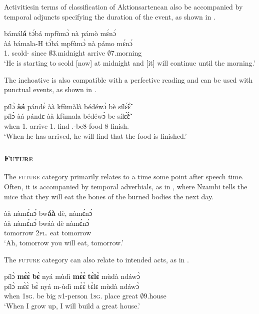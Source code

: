 Activities{\textemdash}in terms of  classification of Aktionsarten{\textemdash}can also be accompanied by temporal adjuncts specifying the duration of the event, as shown in .

\ea\label{inchbound}
   bámál{\bfseries á} tɔ́bá mpfùmɔ̀ nà pámò mɛ́nɔ́\\
       àá bámala-H tɔ́bá mpfùmɔ̀ nà pámo mɛ́nɔ́ \\
       1.{\INCH} scold-{\R} since  $\emptyset$3.midnight {\CONJ} arrive $\emptyset$7.morning\\
    \trans `He is starting to scold [now] at midnight and [it] will continue until the morning.'
\z

The inchoative is also compatible with a perfective reading and can be used with punctual events, as shown in .

\ea\label{inchfut}
  \glll  pílɔ̀ {\bfseries àá} pándɛ̀ àà kfùmàlà bédéwɔ̀ bè sílɛ̃́ɛ̃̀ \\
         pílɔ̀ àá pándɛ àà kfùmala bédéwɔ̀ be sílɛ̃́ɛ̃̀ \\
           when 1.{\INCH} arrive 1.{\FUT} find {\OBJ}.{\LINK}-be8-food 8 finish.{\COMPL}  \\
    \trans `When he has arrived, he will find that the food is finished.'
\z





\subsubsection{\textsc{Future}}
\label{sec:fut}

The \textsc{future} category primarily relates to a time some point after speech time. Often, it is accompanied by temporal adverbials, as in , where Nzambi tells the mice that they will eat the bones of the burned bodies the next day.

\ea\label{FUT1}
  \glll àà nàmɛ́nɔ́ bw{\bfseries áà} dè, nàmɛ́nɔ́ \\
        àà nàmɛ́nɔ́ bwáà dè nàmɛ́nɔ́ \\
       {\EXCL} tomorrow 2\textsc{pl}.{\FUT} eat tomorrow\\
    \trans `Ah, tomorrow you will eat, tomorrow.'
\z

\noindent The \textsc{future} category can also relate to intended acts, as in .


\ea\label{futintention}
  \glll  pílɔ̀ {\bfseries mɛ̀ɛ̀} {\bfseries bɛ̀} nyá mùdì {\bfseries mɛ̀ɛ̀} {\bfseries tɛ̀lɛ̀} mùdà ndáwɔ̀ \\
         pílɔ̀ mɛ̀ɛ̀ bɛ̀ nyá m-ùdì mɛ̀ɛ̀ tɛ̀lɛ mùdà ndáwɔ̀ \\
           when 1\textsc{sg}.{\FUT} be big \textsc{n}1-person 1\textsc{sg}.{\FUT} place great $\emptyset$9.house\\
    \trans `When I grow up, I will build a great house.'
\z

